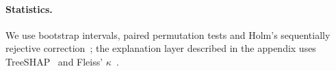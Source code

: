 \paragraph{Statistics.}
We use bootstrap intervals, paired permutation tests and Holm's sequentially rejective
correction~\citep{holm1979}; the explanation layer described in the appendix uses
TreeSHAP~\citep{lundberg2017,lundberg2020} and Fleiss' $\kappa$~\citep{fleiss1971,landis1977}.
